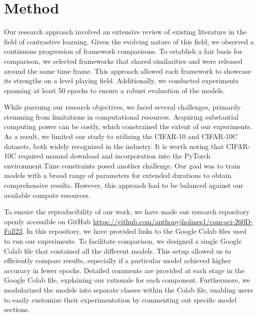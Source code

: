 \section{Method}

\iffalse
\begin{enumerate}
    \item Describe the research design, approach, and methodology.
    \item Detail the procedures and tools used for data collection and analysis.
    \item Ensure clarity and reproducibility for readers.
\end{enumerate}
\fi

Our research approach involved an extensive review of existing literature in the field of contrastive learning. Given the evolving nature of this field, we observed a continuous progression of framework comparisons. To establish a fair basis for comparison, we selected frameworks that shared similarities and were released around the same time frame. This approach allowed each framework to showcase its strengths on a level playing field. Additionally, we conducted experiments spanning at least 50 epochs to ensure a robust evaluation of the models.

While pursuing our research objectives, we faced several challenges, primarily stemming from limitations in computational resources. Acquiring substantial computing power can be costly, which constrained the extent of our experiments. As a result, we limited our study to utilizing the CIFAR-10 and CIFAR-10C datasets, both widely recognized in the industry. It is worth noting that CIFAR-10C required manual download and incorporation into the PyTorch environment.Time constraints posed another challenge. Our goal was to train models with a broad range of parameters for extended durations to obtain comprehensive results. However, this approach had to be balanced against our available compute resources.

To ensure the reproducibility of our work, we have made our research repository openly accessible on GitHub \url{https://github.com/anthonyjholmes1/com-sci-260D-Fall23}. In this repository, we have provided links to the Google Colab files used to run our experiments. To facilitate comparison, we designed a single Google Colab file that contained all the different models. This setup allowed us to efficiently compare results, especially if a particular model achieved higher accuracy in fewer epochs. Detailed comments are provided at each stage in the Google Colab file, explaining our rationale for each component. Furthermore, we modularized the models into separate classes within the Colab file, enabling users to easily customize their experimentation by commenting out specific model sections.